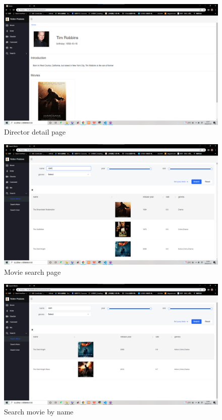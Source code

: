 \begin{CJK*}{UTF8}{gbsn}
    \begin{figure}[htbp]
    \centering
    \includegraphics[width=1\textwidth]{res_actor2.png}
    \caption{Director detail page}
    \end{figure}
    
    \begin{figure}[htbp]
    \centering
    \includegraphics[width=1\textwidth]{res_search1.png}
    \caption{Movie search page}
    \end{figure}
    
    \begin{figure}[htbp]
    \centering
    \includegraphics[width=1\textwidth]{res_search2.png}
    \caption{Search movie by name}
    \end{figure}
    

\end{CJK*}
